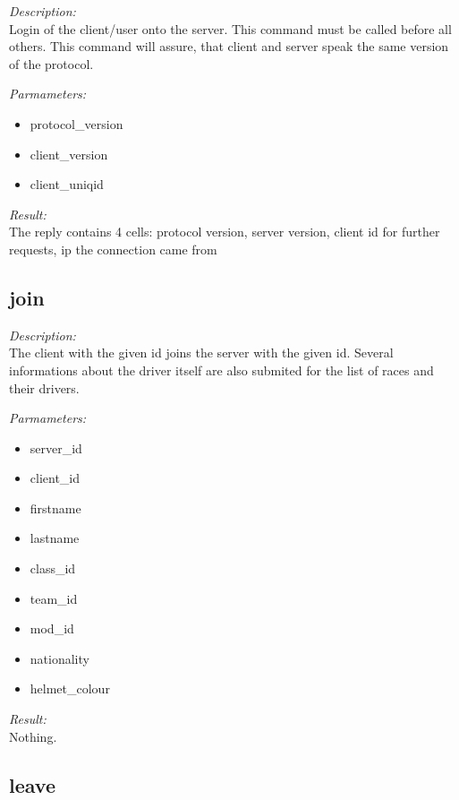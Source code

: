 \begin{description}
\item {\it Description:}\\
Login of the client/user onto the server. This command must be called before all others. This command will assure, that client and server speak the same version of the protocol.
\item {\it Parmameters:}
\begin{itemize}
\item protocol\_version
\item client\_version
\item client\_uniqid
\end{itemize}
\item {\it Result:}\\
The reply contains 4 cells: protocol version, server version, client id for further requests, ip the connection came from
\end{description}

\subsection{join}

\begin{description}
\item {\it Description:}\\
The client with the given id joins the server with the given id. Several informations about the driver itself are also submited for the list of races and their drivers.
\item {\it Parmameters:}
\begin{itemize}
\item server\_id
\item client\_id
\item firstname
\item lastname
\item class\_id
\item team\_id
\item mod\_id
\item nationality
\item helmet\_colour
\end{itemize}
\item {\it Result:}\\
Nothing.
\end{description}

\subsection{leave}

